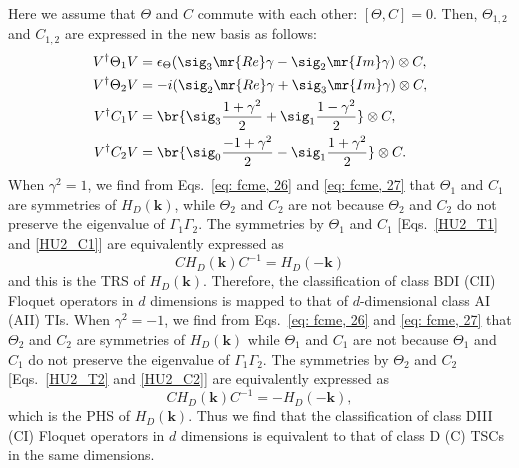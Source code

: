 \documentclass[
floatfix,
pra,
twocolumn,
reprint,
amsmath,amssymb,
aps,
footnote,
]{revtex4}
\begin{document}
Here we assume that $\Theta$ and $C$ commute with each other: $[\Theta,C]=0$.
Then, $\Theta_{1,2}$ and $C_{1,2}$ are expressed in the new basis as follows:
\begin{align}
	V^\dag \Theta_1 V &=
	\epsilon_\Theta (\sig_3 \mr{Re}\gamma - \sig_2\mr{Im}\gamma) \otimes C
	, \\
	V^\dag \Theta_2 V &=
	-i (\sig_2\mr{Re}\gamma + \sig_3 \mr{Im}\gamma) \otimes C
	, \label{eq: fcme, 26}\\
	V^\dag C_1 V &=
	\br{\sig_3 {1+\gamma^2 \over 2} + \sig_1{1-\gamma^2 \over 2}}
	\otimes C
	, \\
	V^\dag C_2 V &=
	\br{\sig_0 {-1+\gamma^2 \over 2} - \sig_1{1+\gamma^2 \over 2}}
	\otimes C
	. \label{eq: fcme, 27}
\end{align}
When $\gamma^2 = 1$, we find from Eqs.~\eqref{eq: fcme, 26} and \eqref{eq: fcme, 27} that $\Theta_1$ and $C_1$ are symmetries of $H_D(\bm{k})$, while $\Theta_2$ and $C_2$ are not because $\Theta_2$ and $C_2$ do not preserve the eigenvalue of $\Gamma_1\Gamma_2$.
The symmetries by $\Theta_1$ and $C_1$ [Eqs.~\eqref{HU2_T1} and \eqref{HU2_C1}] are equivalently expressed as
\begin{equation}
C H_D(\bm{k})C^{-1}=H_D(-\bm{k})
\end{equation}
and this is the TRS of $H_D(\bm{k})$.
Therefore, the classification of class BDI (CII) Floquet operators in $d$ dimensions is mapped to that of $d$-dimensional class AI (AII) TIs.
When $\gamma^2 = -1$, we find from Eqs.~\eqref{eq: fcme, 26} and \eqref{eq: fcme, 27} that $\Theta_2$ and $C_2$ are symmetries of $H_D(\bm{k})$ while $\Theta_1$ and $C_1$ are not because $\Theta_1$ and $C_1$ do not preserve the eigenvalue of $\Gamma_1\Gamma_2$.
The symmetries by $\Theta_2$ and $C_2$ [Eqs.~\eqref{HU2_T2} and \eqref{HU2_C2}] are equivalently expressed as \begin{equation}
C H_D(\bm{k})C^{-1}=-H_D(-\bm{k}),
\end{equation}
which is the PHS of $H_D(\bm{k})$.
Thus we find that the classification of class DIII (CI) Floquet operators in $d$ dimensions is equivalent to that of class D (C) TSCs in the same dimensions.
\end{document}
